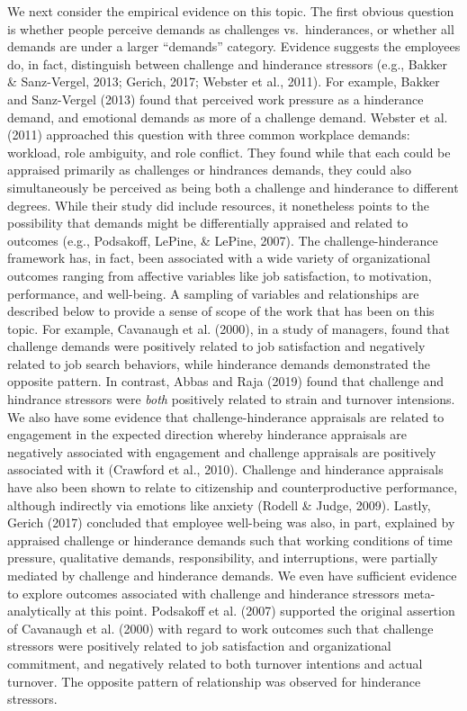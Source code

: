 \documentclass[
  english,
  man]{apa6}
\begin{document}
We next consider the empirical evidence on this topic. The first obvious question is whether people perceive demands as challenges vs.~hinderances, or whether all demands are under a larger \enquote{demands} category. Evidence suggests the employees do, in fact, distinguish between challenge and hinderance stressors (e.g., Bakker \& Sanz-Vergel, 2013; Gerich, 2017; Webster et al., 2011). For example, Bakker and Sanz-Vergel (2013) found that perceived work pressure as a hinderance demand, and emotional demands as more of a challenge demand. Webster et al. (2011) approached this question with three common workplace demands: workload, role ambiguity, and role conflict. They found while that each could be appraised primarily as challenges or hindrances demands, they could also simultaneously be perceived as being both a challenge and hinderance to different degrees.
While their study did include resources, it nonetheless points to the possibility that demands might be differentially appraised and related to outcomes (e.g., Podsakoff, LePine, \& LePine, 2007). The challenge-hinderance framework has, in fact, been associated with a wide variety of organizational outcomes ranging from affective variables like job satisfaction, to motivation, performance, and well-being. A sampling of variables and relationships are described below to provide a sense of scope of the work that has been on this topic. For example, Cavanaugh et al. (2000), in a study of managers, found that challenge demands were positively related to job satisfaction and negatively related to job search behaviors, while hinderance demands demonstrated the opposite pattern. In contrast, Abbas and Raja (2019) found that challenge and hindrance stressors were \emph{both} positively related to strain and turnover intensions. We also have some evidence that challenge-hinderance appraisals are related to engagement in the expected direction whereby hinderance appraisals are negatively associated with engagement and challenge appraisals are positively associated with it (Crawford et al., 2010). Challenge and hinderance appraisals have also been shown to relate to citizenship and counterproductive performance, although indirectly via emotions like anxiety (Rodell \& Judge, 2009). Lastly, Gerich (2017) concluded that employee well-being was also, in part, explained by appraised challenge or hinderance demands such that working conditions of time pressure, qualitative demands, responsibility, and interruptions, were partially mediated by challenge and hinderance demands.
We even have sufficient evidence to explore outcomes associated with challenge and hinderance stressors meta-analytically at this point. Podsakoff et al. (2007) supported the original assertion of Cavanaugh et al. (2000) with regard to work outcomes such that challenge stressors were positively related to job satisfaction and organizational commitment, and negatively related to both turnover intentions and actual turnover. The opposite pattern of relationship was observed for hinderance stressors.
\end{document}

